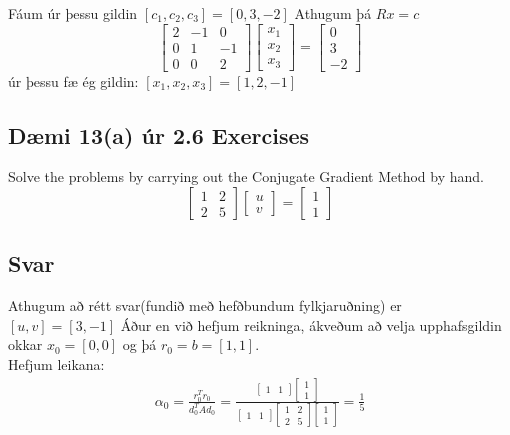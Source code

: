 \documentclass[11pt]{article}
\begin{document}
Fáum úr þessu gildin $[c_1, c_2, c_3] = [0, 3, -2]$ Athugum þá $Rx=c$
$$
\begin{bmatrix}
2 & -1 & 0\\
0 & 1  & -1\\
0 & 0 & 2
\end{bmatrix}
\begin{bmatrix}
x_1\\
x_2\\
x_3
\end{bmatrix}
=
\begin{bmatrix}
0\\
3\\
-2
\end{bmatrix}
$$
úr þessu fæ ég gildin: $[x_1,x_2,x_3] = [1,2,-1]$

\subsection*{Dæmi 13(a) úr 2.6 Exercises}
Solve the problems by carrying out the Conjugate Gradient Method by hand.
$$
\begin{bmatrix}
1 & 2\\
2 & 5
\end{bmatrix}
\begin{bmatrix}
u\\
v
\end{bmatrix}
=
\begin{bmatrix}
1\\
1
\end{bmatrix}
$$
\subsection*{Svar}
Athugum að rétt svar(fundið með hefðbundum fylkjaruðning) er $[u,v]=[3,-1]$
Áður en við hefjum reikninga, ákveðum að velja upphafsgildin okkar $x_0 = [0,0]$ og þá $r_0 = b = [1,1]$.\\
Hefjum leikana:
\begin{align*}%
\alpha_0 = \frac{r_0^Tr_0}{d_0^TAd_0} = \frac{\begin{bmatrix}
1 & 1
\end{bmatrix}
\begin{bmatrix}
1\\1
\end{bmatrix}}{\begin{bmatrix}
1 & 1
\end{bmatrix}\begin{bmatrix}
1 & 2\\
2 & 5
\end{bmatrix}
\begin{bmatrix}
1\\1
\end{bmatrix} }
=\frac{1}{5}
\end{align*}
\end{document}
